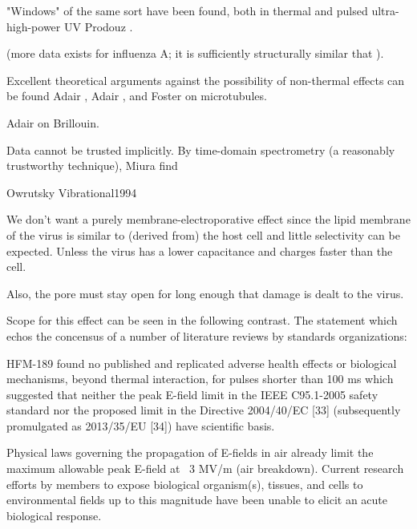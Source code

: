 \documentclass[paper.tex]{subfiles}
\begin{document}
\begin{multicols}{1}
"Windows" of the same sort have been found, both in thermal and pulsed ultra-high-power UV Prodouz \cite{Use1987a}.


(more data exists for influenza A; it is sufficiently structurally similar that ).



Excellent theoretical arguments against the possibility of non-thermal effects can be found Adair \cite{Vibrational2002}, Adair \cite{Biological2002}, and Foster \cite{Viscous2000} on microtubules. 



Adair \cite{Biophysics2000} on Brillouin.


Data cannot be trusted implicitly. By time-domain spectrometry (a reasonably trustworthy technique), Miura \cite{Microwave1994} find 


Owrutsky Vibrational1994




We don't want a purely membrane-electroporative effect since the lipid membrane of the virus is similar to (derived from) the host cell and little selectivity can be expected. Unless the virus has a lower capacitance and charges faster than the cell.

Also, the pore must stay open for long enough that damage is dealt to the virus. 



Scope for this effect can be seen in the following contrast. The statement which echos the concensus of a number of literature reviews by standards organizations:

\begin{fquote}
	HFM-189 found no published and replicated adverse health effects or biological mechanisms, beyond
	thermal interaction, for pulses shorter than 100 ms which suggested that neither the peak E-field limit in the
	IEEE C95.1-2005 safety standard {} nor the proposed limit in the Directive 2004/40/EC [33] (subsequently promulgated as 2013/35/EU [34]) have scientific basis. 
	
	Physical laws governing the propagation of E-fields in air already limit the maximum allowable peak E-field at ~3 MV/m (air breakdown). Current research efforts by members to expose biological organism(s), tissues, and cells to environmental
	fields up to this magnitude have been unable to elicit an acute biological response.
\end{fquote}


\end{multicols}
\end{document}
